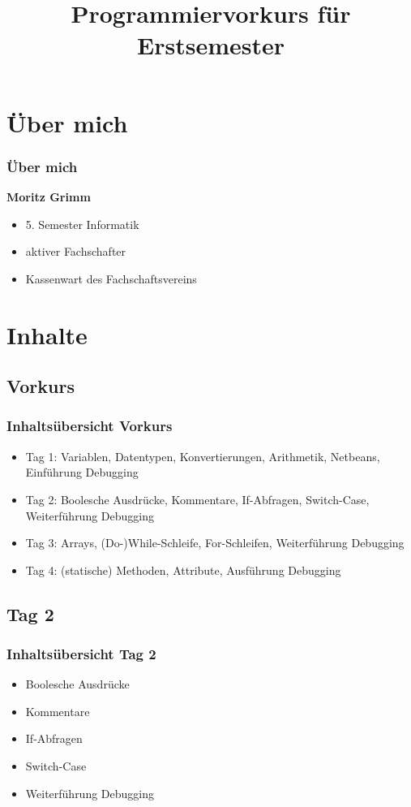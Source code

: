 \documentclass[final]{beamer}
\title{Programmiervorkurs für Erstsemester}
\begin{document}
\lstset{tabsize=2}
\lstset{basicstyle=\small}
\lstset{language=java}
\lstset{showstringspaces=false}
\begin{frame}
  \titlepage
\end{frame}

\section{Über mich}
\begin{frame}
	\frametitle{Über mich}
	\textbf{Moritz Grimm}
	\begin{itemize}
		\item{5. Semester Informatik}
		\item{aktiver Fachschafter}
		\item{Kassenwart des Fachschaftsvereins}
	\end{itemize}
\end{frame}

\section{Inhalte}
\subsection{Vorkurs}
\begin{frame}
	\frametitle{Inhaltsübersicht Vorkurs}
	\begin{itemize}
		\item {Tag 1: Variablen, Datentypen, Konvertierungen, Arithmetik, Netbeans, Einführung Debugging}
		\item {Tag 2: Boolesche Ausdrücke, Kommentare, If-Abfragen, Switch-Case, Weiterführung Debugging}
		\item {Tag 3: Arrays, (Do-)While-Schleife, For-Schleifen, Weiterführung Debugging}
		\item {Tag 4: (statische) Methoden, Attribute, Ausführung Debugging}
	\end{itemize}
\end{frame}

\subsection{Tag 2}
\begin{frame}
	\frametitle{Inhaltsübersicht Tag 2}
	\begin{itemize}
		\item {Boolesche Ausdrücke}
		\item {Kommentare}
		\item {If-Abfragen}
		\item {Switch-Case}
		\item {Weiterführung Debugging}
	\end{itemize}
\end{frame}
\end{document}

